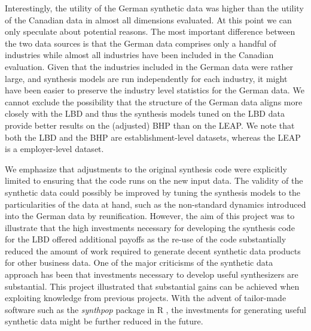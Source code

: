 \documentclass[10pt,twoside]{article}
\begin{document}
Interestingly, the utility of the German synthetic data was higher than the utility of the Canadian data in almost all dimensions evaluated. At this point we can only speculate about potential reasons. The most important difference between the two data sources is that the German data comprises only a handful of industries while almost all industries have been included in the Canadian evaluation. Given that the industries included in the German data were rather large, and synthesis models are run independently for each industry, it might have been easier to preserve the industry level statistics for the German data. We cannot exclude the possibility that  the structure of the German data aligns more closely with the LBD and thus the synthesis models tuned on the LBD data provide better results on the (adjusted) BHP than on the LEAP. We note that both the LBD and the BHP are establishment-level datasets, whereas the LEAP is a employer-level dataset. 

We emphasize that adjustments to the original synthesis code were explicitly limited to ensuring that the code runs on the new input data. The validity of the synthetic data could possibly be improved by tuning the synthesis models to the particularities of the data at hand, such as the non-standard dynamics introduced into the German data by reunification.  However, the aim of this project was to illustrate that the high investments necessary for developing the synthesis code for the LBD offered additional payoffs as the re-use of the code substantially reduced the amount of work required to generate decent synthetic data products for other business data. One of the major criticisms of the synthetic data approach has been  that investments necessary to develop useful synthesizers are substantial. This project illustrated that substantial gains can be achieved when exploiting knowledge from previous projects. With the advent of tailor-made software such as the \textit{synthpop} package in R \citep{JSSv074i11}, the investments for generating useful synthetic data might be further reduced in the future.
\end{document}
